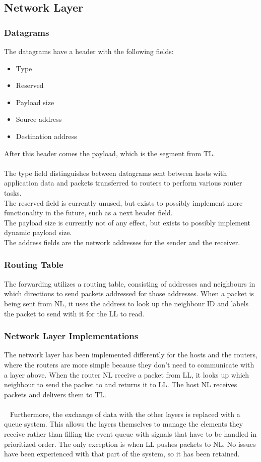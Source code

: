 \subsection{Network Layer}
\subsubsection{Datagrams}
\label{sec:DATAGRAM}
The datagrams have a header with the following fields:
\begin{itemize}
\item Type
\item Reserved
\item Payload size
\item Source address
\item Destination address
\end{itemize}

After this header comes the payload, which is the segment from TL.\\
\\
The type field distinguishes between datagrams sent between hosts with application data and packets transferred to routers to perform various router tasks.\\
The reserved field is currently unused, but exists to possibly implement more functionality in the future, such as a next header field.\\
The payload size is currently not of any effect, but exists to possibly implement dynamic payload size.\\
The address fields are the network addresses for the sender and the receiver.

\subsubsection{Routing Table}
The forwarding utilizes a routing table, consisting of addresses and neighbours in which directions to send packets addressed for those addresses. When a packet is being sent from NL, it uses the address to look up the neighbour ID and labels the packet to send with it for the LL to read.

\subsubsection{Network Layer Implementations}
The network layer has been implemented differently for the hosts and the routers, where the routers are more simple because they don't need to communicate with a layer above. When the router NL receive a packet from LL, it looks up which neighbour to send the packet to and returns it to LL. The host NL receives packets and delivers them to TL.\\
\\~
Furthermore, the exchange of data with the other layers is replaced with a queue system. This allows the layers themselves to manage the elements they receive rather than filling the event queue with signals that have to be handled in prioritized order. The only exception is when LL pushes packets to NL. No issues have been experienced with that part of the system, so it has been retained.

